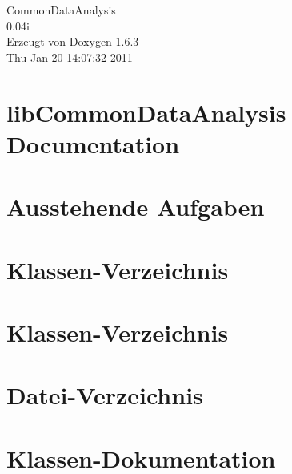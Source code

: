 \documentclass[a4paper]{book}
\begin{document}
\hypersetup{pageanchor=false}
\begin{titlepage}
\vspace*{7cm}
\begin{center}
{\Large CommonDataAnalysis \\[1ex]\large 0.04i }\\
\vspace*{1cm}
{\large Erzeugt von Doxygen 1.6.3}\\
\vspace*{0.5cm}
{\small Thu Jan 20 14:07:32 2011}\\
\end{center}
\end{titlepage}
\clearemptydoublepage
{}
\tableofcontents
\clearemptydoublepage
{}
\hypersetup{pageanchor=true}
\chapter{libCommonDataAnalysis Documentation}
\label{index}\hypertarget{index}{}
\chapter{Ausstehende Aufgaben}
\label{todo}
\hypertarget{todo}{}

\chapter{Klassen-\/Verzeichnis}

\chapter{Klassen-\/Verzeichnis}

\chapter{Datei-\/Verzeichnis}

\chapter{Klassen-\/Dokumentation}

















\end{document}
